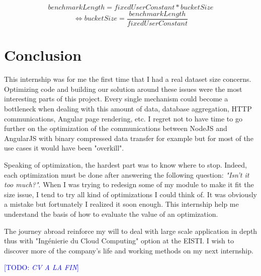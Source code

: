 \documentclass[a4paper,11pt]{report}
\newcommand*{\todo}[1]{\textcolor{blue}{[TODO: \emph{#1}]}}
\begin{document}
$$ benchmarkLength = fixedUserConstant * bucketSize $$
$$\Longleftrightarrow bucketSize = \frac{benchmarkLength}{fixedUserConstant} $$

\clearpage

\chapter*{Conclusion}

This internship was for me the first time that I had a real dataset size concerns. Optimizing code and building our solution around these issues were the most interesting parts of this project. Every single mechanism could become a bottleneck when dealing with this amount of data, database aggregation, HTTP communications, Angular page rendering, etc. I regret not to have time to go further on the optimization of the communications between NodeJS and AngularJS with binary compressed data transfer for example but for most of the use cases it would have been "overkill".

Speaking of optimization, the hardest part was to know where to stop. Indeed, each optimization must be done after answering the following question: \textit{"Isn't it too much?"}. When I was trying to redesign some of my module to make it fit the size issue, I tend to try all kind of optimizations I could think of. It was obviously a mistake but fortunately I realized it soon enough. This internship help me understand the basis of how to evaluate the value of an optimization.

The journey abroad reinforce my will to deal with large scale application in depth thus with "Ingénierie du Cloud Computing" option at the EISTI. I wish to discover more of the company's life and working methods on my next internship.

\todo{CV A LA FIN}
\clearpage




\clearpage

\newpage

\end{document}
